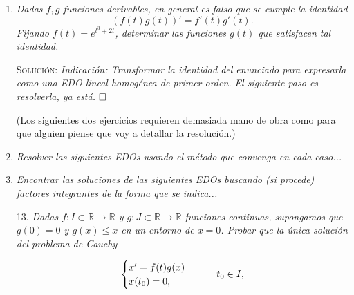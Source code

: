 \documentclass{article}
\begin{document}
\begin{enumerate}
\begin{enumerate}
        \vspace{7px}

        \textsc{Solución}: Me temo que no. A modo de contraejemplo, basta estudiar el caso de la igualdad $a(t) = 1/t$. La mano de obra recae sobre tus hombros. $\hfill\square$
    \end{enumerate}

    \vspace{12px}

    \item \textit{Dadas $f, g$ funciones derivables, en general es falso que se cumple la identidad \[(f(t)g(t))' = f'(t)g'(t).\] Fijando $f(t) = e^{t^3 + 2t}$, determinar las funciones $g(t)$ que satisfacen tal identidad.}

    \vspace{7px}

    \textsc{Solución}: \textit{Indicación: Transformar la identidad del enunciado para expresarla como una EDO lineal homogénea de primer orden. El siguiente paso es resolverla, ya está.} $\hfill\square$

    \begin{center}
        {(Los siguientes dos ejercicios requieren demasiada mano de obra como para que alguien piense que voy a detallar la resolución.)}
    \end{center}

    \item \textit{Resolver las siguientes EDOs usando el método que convenga en cada caso...}

    \vspace{12px}

    \item \textit{Encontrar las soluciones de las siguientes EDOs buscando (si procede) factores integrantes de la forma que se indica...}

    \vspace{7px}

    \item[13.] \textit{Dadas $f : I \subset \mathbb{R} \rightarrow \mathbb{R}$ y $g : J \subset \mathbb{R} \rightarrow \mathbb{R}$ funciones continuas, supongamos que $g(0) = 0$ y $g(x) \leq x$ en un entorno de $x = 0$. Probar que la única solución del problema de Cauchy}
    
    \[
    \begin{cases}
        x' = f(t)g(x) \\
        x(t_0) = 0,
    \end{cases}
    \hspace{20px}
    t_0 \in I,
    \]


\end{enumerate}
\end{document}
